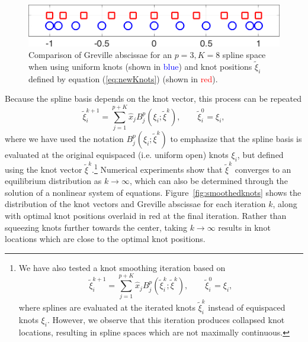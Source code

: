 \documentclass[preprint,10pt]{elsarticle}
\begin{document}
\begin{figure}
\centering
\includegraphics[width=.5\textwidth]{grevilleComparison.png}
\caption{Comparison of Greville abscissae for an $p=3, K = 8$ spline space when using uniform knots (shown in \textcolor{blue}{blue}) and knot positions $\tilde{\xi}_i$ defined by equation (\ref{eq:newKnots}) (shown in \textcolor{red}{red}).}
\label{fig:grevilleComparison}
\end{figure}

Because the spline basis depends on the knot vector, this process can be repeated 
\begin{equation}
\tilde{\xi}^{k+1}_i = \sum_{j=1}^{p+K} \widehat{x}_j B^p_j(\xi_i;  \tilde{\xi}^k), \qquad \tilde{\xi}^0_i = \xi_i,
\label{eq:knotiter}
\end{equation}
where we have used the notation $B^p_j(\xi_i;  \tilde{\xi}^k)$ to emphasize that the spline basis is evaluated at the original equispaced (i.e. uniform open) knots $\xi_i$, but defined using the knot vector $\tilde{\xi}^k$.\footnote{
We have also tested a knot smoothing iteration based on
\begin{equation}
\tilde{\xi}^{k+1}_i = \sum_{j=1}^{p+K} \widehat{x}_j B^p_j( \tilde{\xi}^k_i;  \tilde{\xi}^k), \qquad \tilde{\xi}^0_i = \xi_i,
\end{equation}
where splines are evaluated at the iterated knots $\tilde{\xi}^k_i$ instead of equispaced knots $\xi_i$.  However, we observe that this iteration produces collapsed knot locations, resulting in spline spaces which are not maximally continuous.  
}
Numerical experiments show that $\tilde{\xi}^k$ converges to an equilibrium distribution as $k\rightarrow \infty$, which can also be determined through the solution of a nonlinear system of equations.  Figure~\ref{fig:smoothedknots} shows the distribution of the knot vectors and Greville abscissae for each iteration $k$, along with optimal knot positions overlaid in red at the final iteration.  Rather than squeezing knots further towards the center, taking $k \rightarrow \infty$ results in knot locations which are close to the optimal knot positions.  
\end{document}

